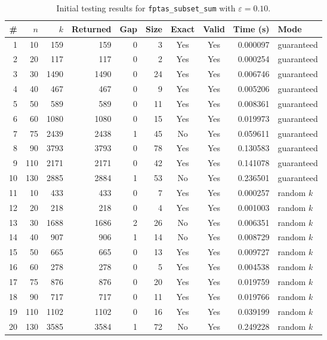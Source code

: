 \documentclass[12pt,a4paper]{article}
\theoremstyle{definition}
\begin{document}
\begin{table}[h!]
  \centering
  \scriptsize
  \renewcommand{\arraystretch}{1.2}
  \begin{tabular}{rrrrrrccrl}
    \toprule
    \# & \(n\) & \(k\) & Returned & Gap & Size & Exact & Valid & Time (s) & Mode \\
    \midrule
     1 &  10 &  159 &  159 &   0 &   3 & Yes & Yes & 0.000097 & guaranteed \\
     2 &  20 &  117 &  117 &   0 &   2 & Yes & Yes & 0.000254 & guaranteed \\
     3 &  30 & 1490 & 1490 &   0 &  24 & Yes & Yes & 0.006746 & guaranteed \\
     4 &  40 &  467 &  467 &   0 &   9 & Yes & Yes & 0.005206 & guaranteed \\
     5 &  50 &  589 &  589 &   0 &  11 & Yes & Yes & 0.008361 & guaranteed \\
     6 &  60 & 1080 & 1080 &   0 &  15 & Yes & Yes & 0.019973 & guaranteed \\
     7 &  75 & 2439 & 2438 &   1 &  45 & No & Yes & 0.059611 & guaranteed \\
     8 &  90 & 3793 & 3793 &   0 &  78 & Yes & Yes & 0.130583 & guaranteed \\
     9 & 110 & 2171 & 2171 &   0 &  42 & Yes & Yes & 0.141078 & guaranteed \\
    10 & 130 & 2885 & 2884 &   1 &  53 & No & Yes & 0.236501 & guaranteed \\
    \midrule
    11 &  10 &  433 &  433 &   0 &   7 & Yes & Yes & 0.000257 & random $k$ \\
    12 &  20 &  218 &  218 &   0 &   4 & Yes & Yes & 0.001003 & random $k$ \\
    13 &  30 & 1688 & 1686 &   2 &  26 & No & Yes & 0.006351 & random $k$ \\
    14 &  40 &  907 &  906 &   1 &  14 & No & Yes & 0.008729 & random $k$ \\
    15 &  50 &  665 &  665 &   0 &  13 & Yes & Yes & 0.009727 & random $k$ \\
    16 &  60 &  278 &  278 &   0 &   5 & Yes & Yes & 0.004538 & random $k$ \\
    17 &  75 &  876 &  876 &   0 &  20 & Yes & Yes & 0.019759 & random $k$ \\
    18 &  90 &  717 &  717 &   0 &  11 & Yes & Yes & 0.019766 & random $k$ \\
    19 & 110 & 1102 & 1102 &   0 &  16 & Yes & Yes & 0.039199 & random $k$ \\
    20 & 130 & 3585 & 3584 &   1 &  72 & No & Yes & 0.249228 & random $k$ \\
    \bottomrule
  \end{tabular}
  \caption{Initial testing results for \texttt{fptas\_subset\_sum} with \(\varepsilon = 0.10\).}
  \label{tab:heuristic-initial}
\end{table}
\end{document}
